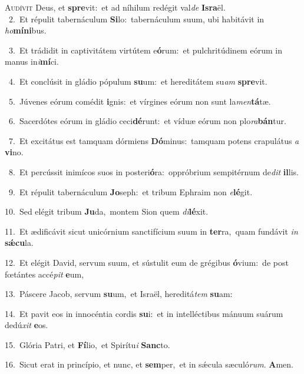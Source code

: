 \lettrine{\initial\textcolor{\initialcolor}{A}}{udívit} Deus, et \textbf{spre}\-vit:~\star et ad níhilum redégit val\textit{de} \textbf{Is}\-\textbf{ra}ël.\\
{\numbfont\textcolor{\numbcolor}{~2.}}~Et répulit tabernáculum \textbf{Si}\-lo:~\star tabernáculum suum, ubi habitávit in \textit{ho}\-\textbf{mí}\textbf{ni}bus.\par
{\numbfont\textcolor{\numbcolor}{~3.}}~Et trádidit in captivitátem virtútem e\-\textbf{ó}\-rum:~\star et pulchritúdinem eórum in manus in\-\textit{i}\-\textbf{mí}ci.\par
{\numbfont\textcolor{\numbcolor}{~4.}}~Et conclúsit in gládio pópulum \textbf{su}\-um:~\star et hereditátem su\textit{am} \textbf{spre}\-vit.\par
{\numbfont\textcolor{\numbcolor}{~5.}}~Júvenes eórum comédit \textbf{i}\-gnis:~\star et vírgines eórum non sunt la\-\textit{men}\-\textbf{tá}tæ.\par
{\numbfont\textcolor{\numbcolor}{~6.}}~Sacerdótes eórum in gládio ceci\-\textbf{dé}\-runt:~\star et víduæ eórum non plo\-\textit{ra}\-\textbf{bán}tur.\par
{\numbfont\textcolor{\numbcolor}{~7.}}~Et excitátus est tamquam dórmiens \textbf{Dó}\-minus:~\star tamquam potens crapulátus \textit{a} \textbf{vi}\-no.\par
{\numbfont\textcolor{\numbcolor}{~8.}}~Et percússit inimícos suos in posteri\-\textbf{ó}\-ra:~\star oppróbrium sempitérnum de\textit{dit} \textbf{il}\-lis.\par
{\numbfont\textcolor{\numbcolor}{~9.}}~Et répulit tabernáculum \textbf{Jo}\-seph:~\star et tribum Ephraim non \textit{e}\-\textbf{lé}git.\par
{\numbfont\textcolor{\numbcolor}{10.}}~Sed elégit tribum \textbf{Ju}\-da,~\star montem Sion quem \textit{di}\-\textbf{lé}xit.\par
{\numbfont\textcolor{\numbcolor}{11.}}~Et ædificávit sicut unicórnium sanctifícium suum in \textbf{ter}\-ra,~\star quam fundávit \textit{in} \textbf{sǽ}\-\textbf{cu}la.\par
{\numbfont\textcolor{\numbcolor}{12.}}~Et elégit David, servum suum, et sústulit eum de grégibus \textbf{ó}\-vium:~\star de post fœtántes accé\textit{pit} \textbf{e}\-um,\par
{\numbfont\textcolor{\numbcolor}{13.}}~Páscere Jacob, servum \textbf{su}\-um,~\star et Israël, hereditá\textit{tem} \textbf{su}\-am:\par
{\numbfont\textcolor{\numbcolor}{14.}}~Et pavit eos in innocéntia cordis \textbf{su}\-i:~\star et in intelléctibus mánuum suárum dedú\textit{xit} \textbf{e}\-os.\par
{\numbfont\textcolor{\numbcolor}{15.}}~Glória Patri, et \textbf{Fí}\-lio,~\star et Spirítu\textit{i} \textbf{Sanc}\-to.\par
{\numbfont\textcolor{\numbcolor}{16.}}~Sicut erat in princípio, et nunc, et \textbf{sem}\-per,~\star et in sǽcula sæculó\-\textit{rum}\-. \textbf{A}\-men.\par
